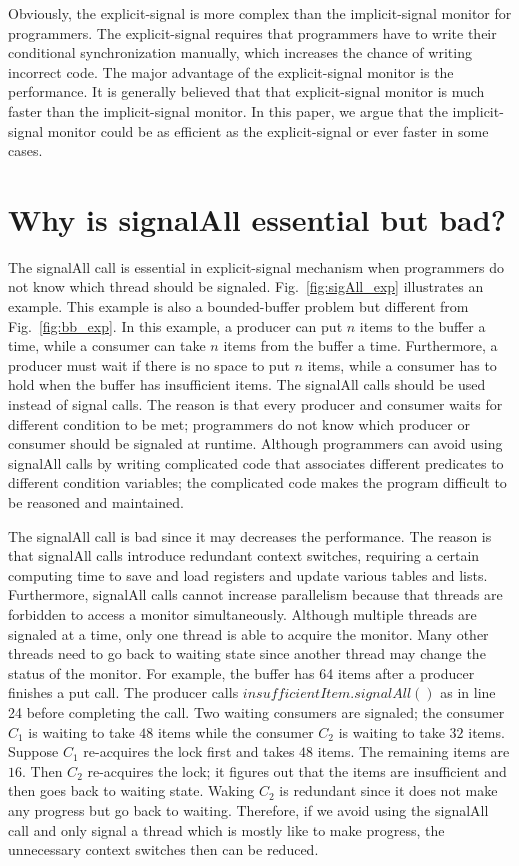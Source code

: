 \documentclass[preprint]{sigplanconf}
\begin{document}
Obviously, the explicit-signal is more complex than the implicit-signal monitor 
for programmers. The explicit-signal requires that programmers
have to write their conditional synchronization manually, which increases the 
chance of writing incorrect code. The major advantage of the explicit-signal
monitor is the performance. It is generally believed that that explicit-signal 
monitor is much faster than the implicit-signal monitor. In this paper, we 
argue that the implicit-signal monitor could be as efficient as the
explicit-signal or ever faster in some cases. 

\section{Why is signalAll essential but bad?} \label{sec:sigAll}
The signalAll call is essential in explicit-signal mechanism when programmers
do not know which thread should be signaled. Fig.~\ref{fig:sigAll_exp}
illustrates an example. This example is also a bounded-buffer problem but 
different from Fig.~\ref{fig:bb_exp}. In this example, a producer can put 
$n$ items to the buffer a time, while a consumer can take $n$ items from the 
buffer a time. Furthermore, a producer must wait if there is no space to put
$n$ items, while a consumer has to hold when the buffer has insufficient items.
The signalAll calls should be used instead of signal calls. The reason is that
every producer and consumer waits for different condition to be met;
programmers do not know which producer or consumer should be signaled at
runtime. Although programmers can avoid using signalAll calls by writing
complicated code that associates different predicates to different condition 
variables; the complicated code makes the program difficult to be reasoned and 
maintained. 

The signalAll call is bad since it may decreases the performance. The reason is 
that signalAll calls introduce redundant context switches, requiring a certain 
computing time to save and load registers and update various tables and lists.
Furthermore, signalAll calls cannot increase parallelism because that threads
are forbidden to access a monitor simultaneously. Although multiple threads are
signaled at a time, only one thread is able to acquire the monitor. Many other 
threads need to go back to waiting state since another thread may change the 
status of the monitor. For example, the buffer has 64 items after a producer 
finishes a put call. The producer calls $insufficientItem.signalAll()$ as in 
line 24 before completing the call. Two waiting consumers are signaled; the 
consumer $C_1$ is waiting to take $48$ items while the consumer $C_2$ is 
waiting to take 
$32$ items. Suppose $C_1$ re-acquires the lock first and takes $48$ items. The
remaining items are $16$. Then $C_2$ re-acquires the lock; it figures out that
the items are insufficient and then goes back to waiting state. Waking $C_2$ is
redundant since it does not make any progress but go back to waiting.
Therefore, if we avoid using the signalAll call and only signal a thread which
is mostly like to make progress, the unnecessary context switches then can be
reduced.
\end{document}
